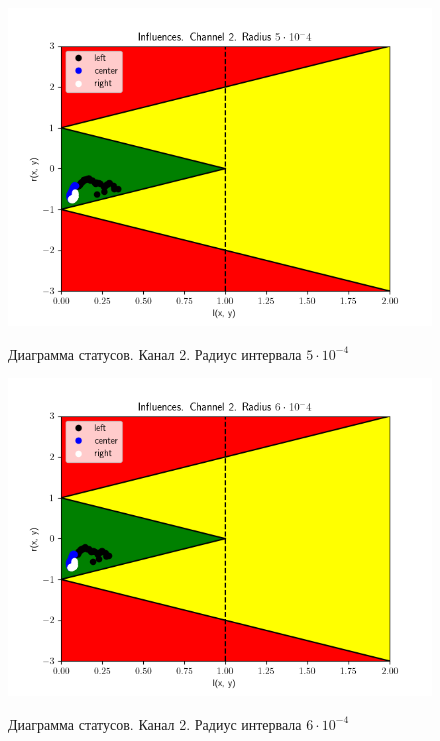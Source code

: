 \begin{figure}[H]
	\begin{center}
		\includegraphics[scale=0.83]{status_ch2_rad5}
		\label{pic:ch25}
		\caption{Диаграмма статусов. Канал 2. Радиус интервала $5 \cdot 10 ^ {-4}$}
	\end{center}
\end{figure}

\begin{figure}[H]
	\begin{center}
		\includegraphics[scale=0.83]{status_ch2_rad6}
		\label{pic:ch26}
		\caption{Диаграмма статусов. Канал 2. Радиус интервала $6 \cdot 10 ^ {-4}$}
	\end{center}
\end{figure}